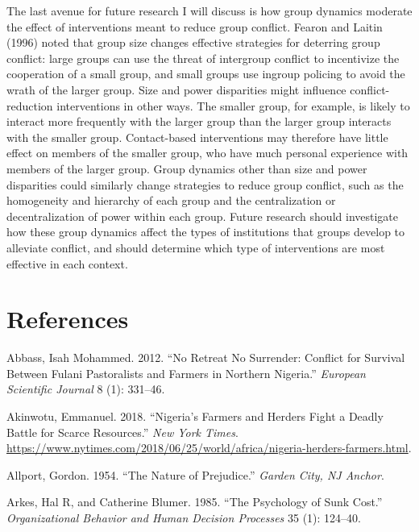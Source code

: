 \documentclass[11pt]{article}
\begin{document}
The last avenue for future research I will discuss is how group dynamics
moderate the effect of interventions meant to reduce group conflict.
Fearon and Laitin (1996) noted that group size changes effective
strategies for deterring group conflict: large groups can use the threat
of intergroup conflict to incentivize the cooperation of a small group,
and small groups use ingroup policing to avoid the wrath of the larger
group. Size and power disparities might influence conflict-reduction
interventions in other ways. The smaller group, for example, is likely
to interact more frequently with the larger group than the larger group
interacts with the smaller group. Contact-based interventions may
therefore have little effect on members of the smaller group, who have
much personal experience with members of the larger group. Group
dynamics other than size and power disparities could similarly change
strategies to reduce group conflict, such as the homogeneity and
hierarchy of each group and the centralization or decentralization of
power within each group. Future research should investigate how these
group dynamics affect the types of institutions that groups develop to
alleviate conflict, and should determine which type of interventions are
most effective in each context.

\hypertarget{references}{%
\section*{References}\label{references}}

\hypertarget{refs}{}
\leavevmode\hypertarget{ref-abbass2012no}{}%
Abbass, Isah Mohammed. 2012. ``No Retreat No Surrender: Conflict for
Survival Between Fulani Pastoralists and Farmers in Northern Nigeria.''
\emph{European Scientific Journal} 8 (1): 331--46.

\leavevmode\hypertarget{ref-nyt2018nigeria}{}%
Akinwotu, Emmanuel. 2018. ``Nigeria's Farmers and Herders Fight a Deadly
Battle for Scarce Resources.'' \emph{New York Times}.
\url{https://www.nytimes.com/2018/06/25/world/africa/nigeria-herders-farmers.html}.

\leavevmode\hypertarget{ref-allport1954prejudice}{}%
Allport, Gordon. 1954. ``The Nature of Prejudice.'' \emph{Garden City,
NJ Anchor}.

\leavevmode\hypertarget{ref-arkes1985psychology}{}%
Arkes, Hal R, and Catherine Blumer. 1985. ``The Psychology of Sunk
Cost.'' \emph{Organizational Behavior and Human Decision Processes} 35
(1): 124--40.
\end{document}

